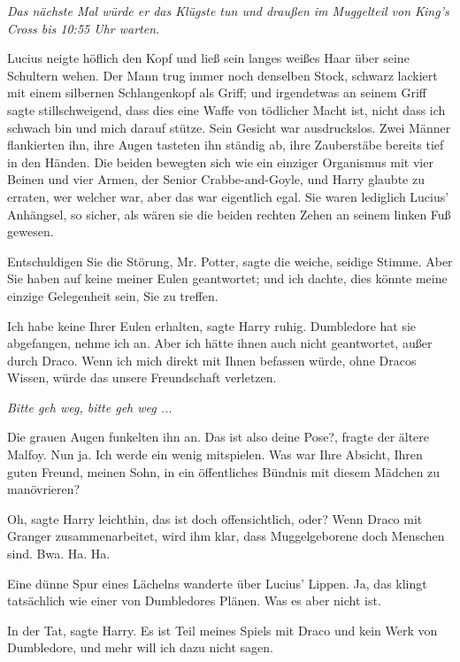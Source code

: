 \emph{Das nächste Mal würde er das Klügste tun und draußen im Muggelteil von
King's Cross bis 10:55 Uhr warten.}

Lucius neigte höflich den Kopf und ließ sein langes weißes Haar über seine
Schultern wehen. Der Mann trug immer noch denselben Stock, schwarz lackiert mit
einem silbernen Schlangenkopf als Griff; und irgendetwas an seinem Griff sagte
stillschweigend, dass dies eine Waffe von tödlicher Macht ist, nicht dass ich
schwach bin und mich darauf stütze. Sein Gesicht war ausdruckslos. Zwei Männer
flankierten ihn, ihre Augen tasteten ihn ständig ab, ihre Zauberstäbe bereits
tief in den Händen. Die beiden bewegten sich wie ein einziger Organismus mit
vier Beinen und vier Armen, der Senior Crabbe-and-Goyle, und Harry glaubte zu
erraten, wer welcher war, aber das war eigentlich egal. Sie waren lediglich
Lucius' Anhängsel, so sicher, als wären sie die beiden rechten Zehen an seinem
linken Fuß gewesen.

\glqq{}Entschuldigen Sie die Störung, Mr. Potter\grqq{}, sagte die weiche,
seidige Stimme. \glqq{}Aber Sie haben auf keine meiner Eulen geantwortet; und
ich dachte, dies könnte meine einzige Gelegenheit sein, Sie zu treffen.\grqq{}

\glqq{}Ich habe keine Ihrer Eulen erhalten\grqq{}, sagte Harry ruhig. \glqq{}
Dumbledore hat sie abgefangen, nehme ich an. Aber ich hätte ihnen auch nicht
geantwortet, außer durch Draco. Wenn ich mich direkt mit Ihnen befassen würde,
ohne Dracos Wissen, würde das unsere Freundschaft verletzen.\grqq{}

\emph{Bitte geh weg, bitte geh weg ...}

Die grauen Augen funkelten ihn an. \glqq{}Das ist also deine Pose?\grqq{},
fragte der ältere Malfoy. \glqq{}Nun ja. Ich werde ein wenig mitspielen. Was war
Ihre Absicht, Ihren guten Freund, meinen Sohn, in ein öffentliches Bündnis mit
diesem Mädchen zu manövrieren?\grqq{}

\glqq{}Oh\grqq{}, sagte Harry leichthin, \glqq{}das ist doch offensichtlich,
oder? Wenn Draco mit Granger zusammenarbeitet, wird ihm klar, dass
Muggelgeborene doch Menschen sind. Bwa. Ha. Ha.\grqq{}

Eine dünne Spur eines Lächelns wanderte über Lucius' Lippen. \glqq{}Ja, das
klingt tatsächlich wie einer von Dumbledores Plänen. Was es aber nicht ist.\grqq{}

\glqq{}In der Tat\grqq{}, sagte Harry. \glqq{}Es ist Teil meines Spiels mit
Draco und kein Werk von Dumbledore, und mehr will ich dazu nicht sagen.\grqq{}

